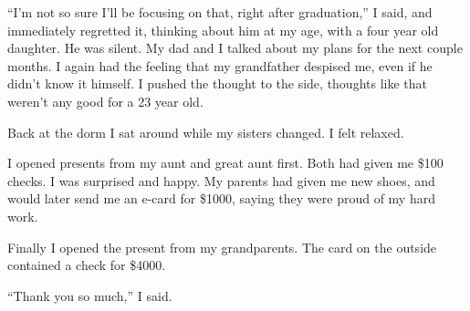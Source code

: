 ``I'm not so sure I'll be focusing on that, right after graduation,'' I said,
and immediately regretted it, thinking about him at my age, with a four year old
daughter.  He was silent.  My dad and I talked about my plans for the next
couple months.  I again had the feeling that my grandfather despised me, even if
he didn't know it himself.  I pushed the thought to the side, thoughts like that
weren't any good for a 23 year old.

Back at the dorm I sat around while my sisters changed.  I felt relaxed.

I opened presents from my aunt and great aunt first.  Both had given me \$100
checks.  I was surprised and happy.  My parents had given me new shoes, and
would later send me an e-card for \$1000, saying they were proud of my hard
work.  

Finally I opened the present from my grandparents.  The card on the outside
contained a check for \$4000.  

``Thank you so much,'' I said.
